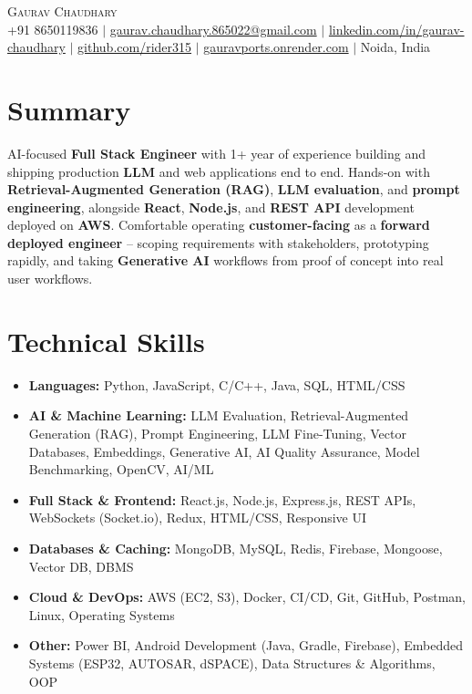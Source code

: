 \documentclass[letterpaper,11pt]{article}
\newcommand{\resumeSummary}[1]{{\small #1}\vspace{-4pt}}
\newcommand{\skillLine}[1]{\item\small{#1}\vspace{-4pt}}
\newcommand{\resumeSkillListStart}{\begin{itemize}[leftmargin=0.15in, label={}]}
\newcommand{\resumeSkillListEnd}{\end{itemize}\vspace{-6pt}}
\begin{document}
\begin{center}
    {\Huge \scshape Gaurav Chaudhary} \\ \vspace{3pt}
    \small
    +91 8650119836 $|$
    \href{mailto:gaurav.chaudhary.865022@gmail.com}{gaurav.chaudhary.865022@gmail.com} $|$
    \href{https://www.linkedin.com/in/gaurav-chaudhary-03900120b/}{linkedin.com/in/gaurav-chaudhary} $|$
    \href{https://github.com/rider315}{github.com/rider315} $|$
    \href{https://gauravports.onrender.com/}{gauravports.onrender.com} $|$
    Noida, India
\end{center}
\vspace{-4pt}

\section{Summary}
\resumeSummary{AI-focused \textbf{Full Stack Engineer} with 1+ year of experience building and shipping production \textbf{LLM} and web applications end to end. Hands-on with \textbf{Retrieval-Augmented Generation (RAG)}, \textbf{LLM evaluation}, and \textbf{prompt engineering}, alongside \textbf{React}, \textbf{Node.js}, and \textbf{REST API} development deployed on \textbf{AWS}. Comfortable operating \textbf{customer-facing} as a \textbf{forward deployed engineer} -- scoping requirements with stakeholders, prototyping rapidly, and taking \textbf{Generative AI} workflows from proof of concept into real user workflows.}

\section{Technical Skills}
\resumeSkillListStart
    \skillLine{\textbf{Languages:} Python, JavaScript, C/C++, Java, SQL, HTML/CSS}
    \skillLine{\textbf{AI \& Machine Learning:} LLM Evaluation, Retrieval-Augmented Generation (RAG), Prompt Engineering, LLM Fine-Tuning, Vector Databases, Embeddings, Generative AI, AI Quality Assurance, Model Benchmarking, OpenCV, AI/ML}
    \skillLine{\textbf{Full Stack \& Frontend:} React.js, Node.js, Express.js, REST APIs, WebSockets (Socket.io), Redux, HTML/CSS, Responsive UI}
    \skillLine{\textbf{Databases \& Caching:} MongoDB, MySQL, Redis, Firebase, Mongoose, Vector DB, DBMS}
    \skillLine{\textbf{Cloud \& DevOps:} AWS (EC2, S3), Docker, CI/CD, Git, GitHub, Postman, Linux, Operating Systems}
    \skillLine{\textbf{Other:} Power BI, Android Development (Java, Gradle, Firebase), Embedded Systems (ESP32, AUTOSAR, dSPACE), Data Structures \& Algorithms, OOP}
\resumeSkillListEnd
\end{document}
